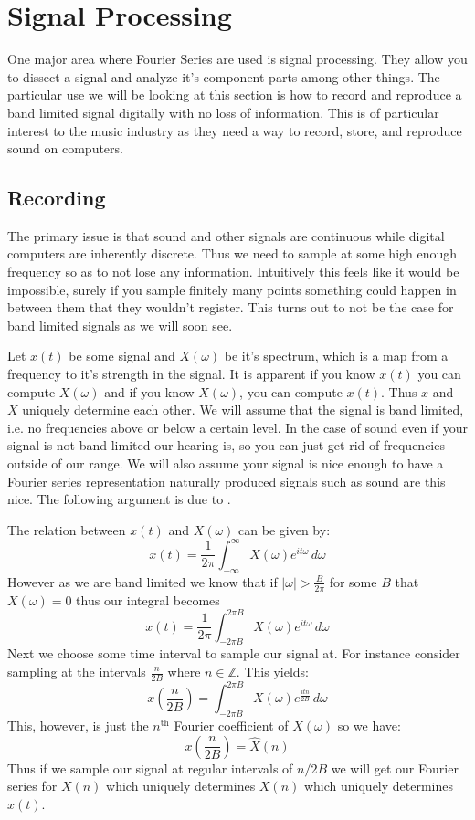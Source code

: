 \documentclass [../article.tex]{subfiles}
\begin{document}
  \section{Signal Processing}
  One major area where Fourier Series are used is signal
  processing. They allow you to dissect a signal and analyze
  it's component parts among other things. The particular use
  we will be looking at this section is how to record and reproduce
  a band limited signal digitally with no loss of information.
  This is of particular interest to the music industry as they
  need a way to record, store, and reproduce sound on computers.

  \subsection{Recording}
  The primary issue is that sound and other signals are continuous
  while digital computers are inherently discrete. Thus we need
  to sample at some high enough frequency so as to not lose any
  information. Intuitively this feels like it would be impossible,
  surely if you sample finitely many points something could happen
  in between them that they wouldn't register. This turns out to not
  be the case for band limited signals as we will soon see.

  Let $x(t)$ be some signal and $X(\omega)$ be it's
  spectrum, which is a map from a frequency to it's
  strength in the signal. It is apparent if you know $x(t)$
  you can compute $X(\omega)$ and if you know $X(\omega)$,
  you can compute $x(t)$. Thus $x$ and $X$ uniquely determine
  each other. We will assume that the signal is band limited, i.e. no
  frequencies above or below a certain level. In the case of
  sound even if your signal is not band limited our hearing is,
  so you can just get rid of frequencies outside of our range.
  We will also assume your signal is nice enough to have a
  Fourier series representation naturally produced signals such
  as sound are this nice. The following argument is due to
  \cite{shannon1949}.

  The relation between $x(t)$ and $X(\omega)$ can be given by:
  \[x(t) = \frac{1}{2\pi}\int_{-\infty}^\infty
  X(\omega)e^{it\omega}\,d\omega\]
  However as we are band limited we know that if
  $|\omega| > \frac{B}{2\pi}$ for some $B$ that
  $X(\omega) = 0$ thus our integral becomes
  \[x(t) = \frac{1}{2\pi}\int_{-2\pi B}^{2\pi B}
  X(\omega)e^{it\omega}\,d\omega\]
  Next we choose some time interval to sample our signal at.
  For instance consider sampling at the intervals $\frac{n}{2B}$
  where $n \in \mathbb{Z}$. This yields:
  \[x\left(\frac{n}{2B}\right) =
  \int_{-2\pi B}^{2\pi B}X(\omega)e^{\frac{itn}{2B}}\,d\omega\]
  This, however, is just the $n^{\text{th}}$ Fourier coefficient
  of $X(\omega)$ so we have:
  \[x\left(\frac{n}{2B}\right) = \hat{X}(n)\]
  Thus if we sample our signal at regular intervals of
  $n/2B$ we will get our Fourier series for $X(n)$ which
  uniquely determines $X(n)$ which uniquely determines $x(t)$.
\end{document}
